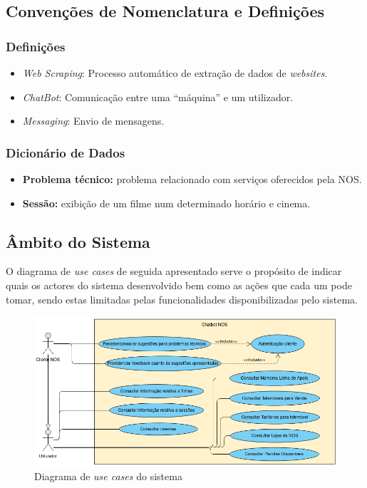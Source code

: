 \documentclass[11pt,a4paper]{article}
\begin{document}
\subsection{Convenções de Nomenclatura e Definições}
\subsubsection{Definições}
\begin{itemize}
    \item \textit{Web Scraping}: Processo automático de extração de dados de \textit{websites}.
    \item \textit{ChatBot}: Comunicação entre uma ``máquina'' e um utilizador.
    \item \textit{Messaging}: Envio de mensagens.
\end{itemize}
\subsubsection{Dicionário de Dados}
\begin{itemize}
    \item \textbf{Problema técnico:} problema relacionado com serviços oferecidos pela NOS.
    \item \textbf{Sessão:} exibição de um filme num determinado horário e cinema.
\end{itemize}

\subsection{Âmbito do Sistema}
O diagrama de \textit{use cases} de seguida apresentado serve o propósito de indicar quais os 
actores do sistema desenvolvido bem como as ações que cada um pode tomar, sendo estas limitadas
pelas funcionalidades disponibilizadas pelo sistema.
\begin{figure}[H]
    \centering
    \includegraphics[width=13cm]{images/usecases_model.png}
    \caption{Diagrama de \textit{use cases} do sistema}
    \label{fig:use_case_diag}
\end{figure}
\end{document}
